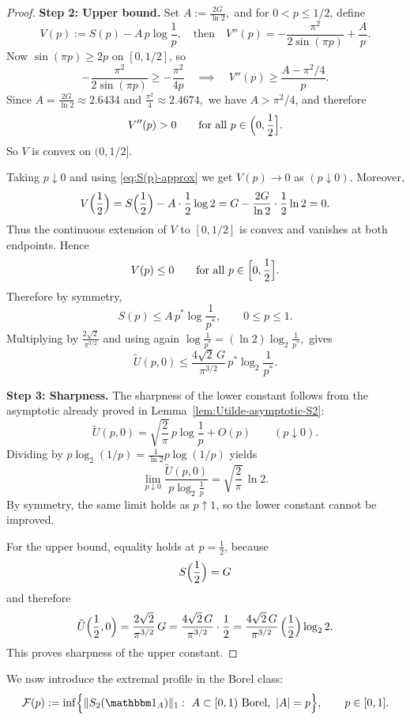 \documentclass[11pt]{amsart}
\theoremstyle{definition}
\renewcommand{\1}{{\mathbbm{1}}}
\begin{document}
\begin{proof}
\textbf{Step 2: Upper bound.}
Set
$
A:=\frac{2G}{\ln2},
$
and for $0<p\le 1/2$, define
\[
V(p):=S(p)-A\,p\log\frac1p,
\quad 
\text{then}
\quad 
V''(p)
=
-\frac{\pi^2}{2\sin(\pi p)}+\frac{A}{p}.
\]
Now $\sin(\pi p)\ge 2p$ on $[0,1/2]$, so
\[
-\frac{\pi^2}{2\sin(\pi p)}
\ge
-\frac{\pi^2}{4p}
\quad 
\implies
\quad 
V''(p)\ge \frac{A-\pi^2/4}{p}.
\]
Since
$
A=\frac{2G}{\ln2}\approx 2.6434
$ and $
\frac{\pi^2}{4}\approx 2.4674,
$
we have $A>\pi^2/4$, and therefore
\[
V''(p)>0
\qquad\text{for all } p\in\Bigl(0,\frac12\Bigr].
\]
So $V$ is convex on $(0,1/2]$.


Taking $ p\downarrow0$ and using \eqref{eq:S(p)-approx} we get
$
V(p)\to 0
$ as $ (p\downarrow0).
$
Moreover,
\[
V\Bigl(\frac12\Bigr)
=
S\Bigl(\frac12\Bigr)-A\cdot \frac12\log2
=
G-\frac{2G}{\ln2}\cdot \frac12\ln2
=
0.
\]
Thus the continuous extension of $V$ to $[0,1/2]$ is convex and vanishes at both endpoints. Hence 
\[
V(p)\le 0
\qquad \text{for all } p\in\Bigl[0,\frac12\Bigr].
\]
Therefore
by symmetry,
\[
S(p)\le A\,p^*\log\frac1{p^*},
\qquad 0\le p\le 1.
\]
Multiplying by $\frac{2\sqrt2}{\pi^{3/2}}$ and using again
$
\log\frac1{p^*}=(\ln2)\log_2\frac1{p^*},
$
gives
\[
\tilde U(p,0)
\le
\frac{4\sqrt2\,G}{\pi^{3/2}}\,p^*\log_2\frac1{p^*}.
\]

\textbf{Step 3: Sharpness.}
The sharpness of the lower constant follows from the asymptotic already proved in Lemma~\ref{lem:Utilde-asymptotic-S2}:
\[
\tilde U(p,0)
=
\sqrt{\frac2\pi}\,p\log\frac1p+O(p)
\qquad (p\downarrow0).
\]
Dividing by $p\log_2(1/p)=\frac{1}{\ln2}p\log(1/p)$ yields
\[
\lim_{p\downarrow0}
\frac{\tilde U(p,0)}{p\log_2\frac1p}
=
\sqrt{\frac2\pi}\,\ln2.
\]
By symmetry, the same limit holds as $p\uparrow1$, so the lower constant cannot be improved.

For the upper bound, equality holds at $p=\frac12$, because
\[
S\Bigl(\frac12\Bigr)=G
\]
and therefore
\[
\tilde U\Bigl(\frac12,0\Bigr)
=
\frac{2\sqrt2}{\pi^{3/2}}\,G
=
\frac{4\sqrt2\,G}{\pi^{3/2}}\cdot \frac12
=
\frac{4\sqrt2\,G}{\pi^{3/2}}\,
\Bigl(\frac12\Bigr)\log_2 2.
\]
This proves sharpness of the upper constant.
\end{proof}


We now introduce the extremal profile in the Borel class:
\[
\mathcal{F}(p):=\inf\Bigl\{\|S_2(\mathbbm 1_A)\|_1:\ A\subset{[0,1)}\ \text{Borel},\ |A|=p\Bigr\},
\qquad p\in[0,1].
\]
\end{document}
